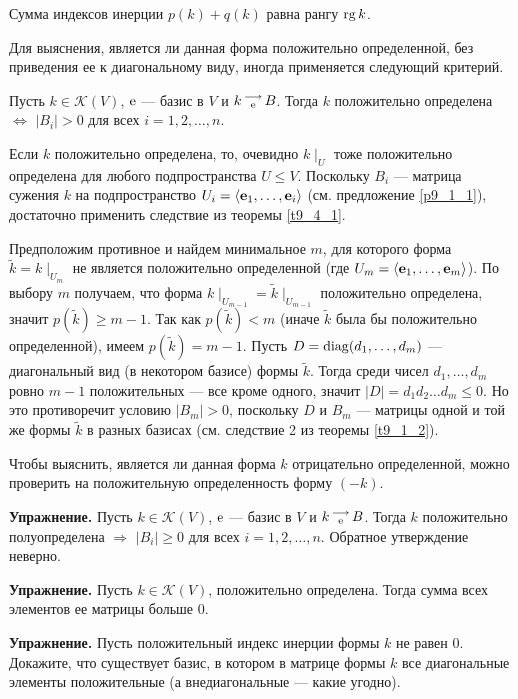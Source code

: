 \begin{sled}
Сумма индексов инерции $p(k)+q(k)$ равна рангу $\mathop{\rm rg}\nolimits k$.
\end{sled}

Для выяснения, является ли данная форма положительно определенной, без приведения ее к диагональному виду, иногда применяется следующий критерий.


\begin{theor}\label{t9_4_3}
Пусть $k\in \mathcal{K}(V)$, $\mathrm{e}$ --- базис в $V$ и $k \begin{smallmatrix} \longrightarrow \\ \mathrm{e} \end{smallmatrix} B$. Тогда
$k$ положительно определена $\Leftrightarrow$ $|B_i|>0$ для всех $i=1, 2, \ldots, n$.
\end{theor}
\dok 
\dokright
Если $k$ положительно определена, то, очевидно $k\mid_U$ тоже положительно определена для любого подпространства $U\leq V$.
Поскольку $B_i$ --- матрица сужения $k$ на подпространство $U_i = \langle \mathbf{e}_1, \ldots, \mathbf{e}_i \rangle$ (см. предложение \ref{p9_1_1}), 
достаточно применить следствие из теоремы \ref{t9_4_1}.

\dokleft
 Предположим противное и найдем минимальное $m$, для которого форма  $\tilde{k} = k\mid_{U_m}$ не является положительно определенной
(где $U_m = \langle \mathbf{e}_1, \ldots , \mathbf{e}_m \rangle$).
По выбору $m$ получаем, что форма $k\mid_{U_{m-1}} = \tilde{k} \mid_{U_{m-1}}$ положительно определена, значит $p(\tilde{k})\geq m-1$. Так
как $p(\tilde{k}) < m$ (иначе $\tilde{k}$ была бы положительно определенной), имеем $p(\tilde{k}) =  m-1$.
Пусть $D=\mathop{\rm diag}\nolimits (d_1, \ldots, d_m)$ %
--- диагональный вид (в некотором базисе) формы $\tilde{k}$. Тогда среди чисел  $d_1, \ldots, d_m$ ровно $m-1$ положительных --- все кроме одного, 
значит $|D| = d_1d_2\ldots d_m\leq 0$. Но это противоречит условию $|B_m|>0$, поскольку $D$ и $B_m$ --- матрицы одной и той же формы $\tilde{k}$ в разных базисах
(см. следствие 2 из теоремы \ref{t9_1_2}).
\edok

\otstup

Чтобы выяснить, является ли данная форма $k$ отрицательно определенной, можно проверить на положительную определенность форму $(-k)$. 

\otstup


{\bf Упражнение.}
Пусть $k\in \mathcal{K}(V)$, $\mathrm{e}$ --- базис в $V$ и $k \begin{smallmatrix} \longrightarrow \\ \mathrm{e} \end{smallmatrix} B$. Тогда
$k$ положительно полуопределена $\Rightarrow$ $|B_i|\geq 0$ для всех $i=1, 2, \ldots, n$.
Обратное утверждение неверно.


{\bf Упражнение.}
Пусть $k\in \mathcal{K}(V)$,  положительно определена. Тогда сумма всех элементов ее матрицы
больше 0.

{\bf Упражнение.}
Пусть положительный индекс инерции формы $k$ не равен 0. Докажите, что 
существует базис, в котором в матрице формы $k$ все диагональные элементы положительные
(а внедиагональные --- какие угодно).
